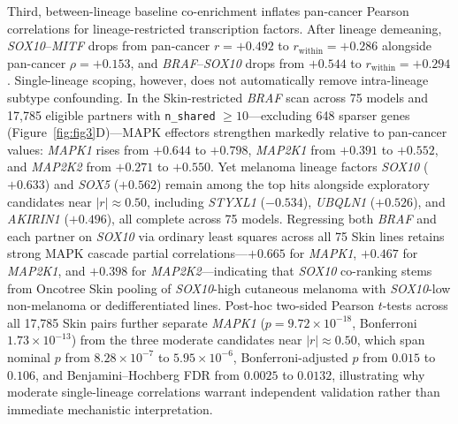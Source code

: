 \documentclass[11pt,a4paper]{article}
\begin{document}
Third, between-lineage baseline co-enrichment inflates pan-cancer Pearson correlations for lineage-restricted transcription factors. After lineage demeaning, \textit{SOX10}--\textit{MITF} drops from pan-cancer $r = +0.492$ to $r_{\mathrm{within}} = +0.286$ alongside pan-cancer $\rho = +0.153$, and \textit{BRAF}--\textit{SOX10} drops from $+0.544$ to $r_{\mathrm{within}} = +0.294$. Single-lineage scoping, however, does not automatically remove intra-lineage subtype confounding. In the Skin-restricted \textit{BRAF} scan across 75 models and 17,785 eligible partners with \texttt{n\_shared} $\ge 10$---excluding 648 sparser genes (Figure~\ref{fig:fig3}D)---MAPK effectors strengthen markedly relative to pan-cancer values: \textit{MAPK1} rises from $+0.644$ to $+0.798$, \textit{MAP2K1} from $+0.391$ to $+0.552$, and \textit{MAP2K2} from $+0.271$ to $+0.550$. Yet melanoma lineage factors \textit{SOX10} ($+0.633$) and \textit{SOX5} ($+0.562$) remain among the top hits alongside exploratory candidates near $|r| \approx 0.50$, including \textit{STYXL1} ($-0.534$), \textit{UBQLN1} ($+0.526$), and \textit{AKIRIN1} ($+0.496$), all complete across 75 models. Regressing both \textit{BRAF} and each partner on \textit{SOX10} via ordinary least squares across all 75 Skin lines retains strong MAPK cascade partial correlations---$+0.665$ for \textit{MAPK1}, $+0.467$ for \textit{MAP2K1}, and $+0.398$ for \textit{MAP2K2}---indicating that \textit{SOX10} co-ranking stems from Oncotree Skin pooling of \textit{SOX10}-high cutaneous melanoma with \textit{SOX10}-low non-melanoma or dedifferentiated lines. Post-hoc two-sided Pearson $t$-tests across all 17,785 Skin pairs further separate \textit{MAPK1} ($p = 9.72 \times 10^{-18}$, Bonferroni $1.73 \times 10^{-13}$) from the three moderate candidates near $|r| \approx 0.50$, which span nominal $p$ from $8.28 \times 10^{-7}$ to $5.95 \times 10^{-6}$, Bonferroni-adjusted $p$ from $0.015$ to $0.106$, and Benjamini--Hochberg FDR from $0.0025$ to $0.0132$, illustrating why moderate single-lineage correlations warrant independent validation rather than immediate mechanistic interpretation.
\end{document}
